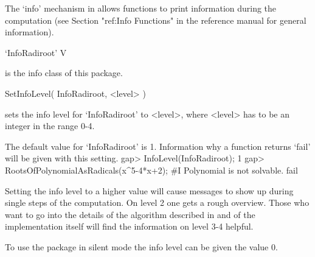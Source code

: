 

The `info' mechanism in {\GAP} allows functions to print information
during the computation (see Section "ref:Info Functions" in the
{\GAP} reference manual for general information).

\> `InfoRadiroot' V

is the info class of this package.

\> SetInfoLevel( InfoRadiroot, <level> )

sets the info level for `InfoRadiroot' to <level>, where <level> has
to be an integer in the range 0-4.

The default value for `InfoRadiroot' is 1. Information why a function
returns `fail' will be given with this setting.
\beginexample
gap> InfoLevel(InfoRadiroot);
1
gap> RootsOfPolynomialAsRadicals(x^5-4*x+2);
#I  Polynomial is not solvable.
fail
\endexample

Setting the info level to a higher value will cause messages to show up during
single steps of the computation. On level 2 one gets a rough
overview. Those who want to go into the details of the algorithm
described in \cite{Distler05} and of the implementation itself will
find the information on level 3-4 helpful.

To use the package in silent mode the info level can be given the
value 0.
